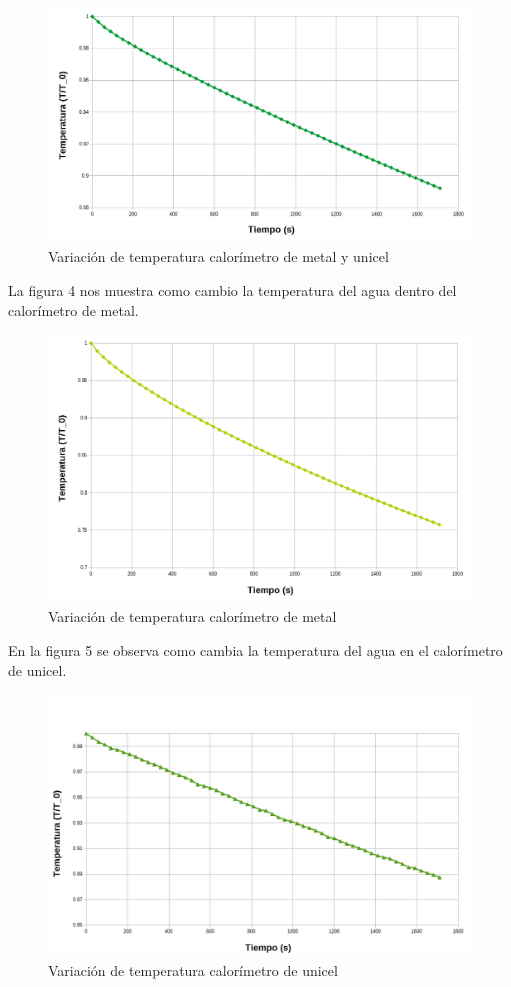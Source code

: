 \documentclass[12pt]{article}
\begin{document}
\begin{figure}[H]
\centering
\includegraphics[scale=0.4]{GraficaCUM.png}
\caption{Variación de temperatura calorímetro de metal y unicel}
\end{figure}
La figura 4 nos muestra como cambio la temperatura del agua dentro del calorímetro de metal.
\begin{figure}[H]
\centering
\includegraphics[scale=0.4]{GraficaCM.png}
\caption{Variación de temperatura calorímetro de metal}
\end{figure}
\pagebreak
En la figura 5 se observa como cambia la temperatura del agua en el calorímetro de unicel.

\begin{figure}[H]
\centering
\includegraphics[scale=0.4]{GraficaCU.png}
\caption{Variación de temperatura calorímetro de unicel}
\end{figure}
\end{document}
